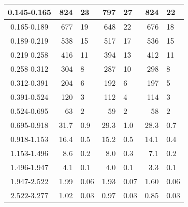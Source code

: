 \begin{table}
\begin{center}
\begin{tabular}{ | c | r@{$\pm$}l | r@{$\pm$}l | r@{$\pm$}l | }
0.145-0.165 & 824 & 23 & 797 & 27 & 824 & 22 \\ \hline
0.165-0.189 & 677 & 19 & 648 & 22 & 676 & 18 \\ \hline
0.189-0.219 & 538 & 15 & 517 & 17 & 536 & 15 \\ \hline
0.219-0.258 & 416 & 11 & 394 & 13 & 412 & 11 \\ \hline
0.258-0.312 & 304 & 8 & 287 & 10 & 298 & 8 \\ \hline
0.312-0.391 & 204 & 6 & 192 & 6 & 197 & 5 \\ \hline
0.391-0.524 & 120 & 3 & 112 & 4 & 114 & 3 \\ \hline
0.524-0.695 & 63 & 2 & 59 & 2 & 58 & 2 \\ \hline
0.695-0.918 & 31.7 & 0.9 & 29.3 & 1.0 & 28.3 & 0.7 \\ \hline
0.918-1.153 & 16.4 & 0.5 & 15.2 & 0.5 & 14.1 & 0.4 \\ \hline
1.153-1.496 & 8.6 & 0.2 & 8.0 & 0.3 & 7.1 & 0.2 \\ \hline
1.496-1.947 & 4.1 & 0.1 & 4.0 & 0.1 & 3.3 & 0.1 \\ \hline
1.947-2.522 & 1.99 & 0.06 & 1.93 & 0.07 & 1.60 & 0.06 \\ \hline
2.522-3.277 & 1.02 & 0.03 & 0.97 & 0.03 & 0.85 & 0.03 \\ \hline
\end{tabular}
\end{center}
\end{table}

